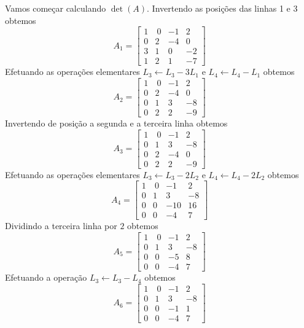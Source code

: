 \begin{solution}
Vamos começar calculando $\det(A)$. 
Invertendo as posições das linhas 1 e 3 obtemos
$$A_1 = \left[ \begin{array}{rrrr}
 1 & \ 0 & -1 &   2 \\  
 0 &   2 & -4 &   0 \\
 3 &   1 &  0 &  -2 \\
 1 &   2 &  1 &  -7
\end{array} \right]$$
Efetuando as operações elementares $L_3 \leftarrow L_3 - 3L_1$ e $L_4 \leftarrow L_4 - L_1$ obtemos
$$A_2 = \left[ \begin{array}{rrrr}
 1 & \ 0 & -1 &   2 \\  
 0 &   2 & -4 &   0 \\
 0 &   1 &  3 &  -8 \\
 0 &   2 &  2 &  -9
\end{array} \right]$$
Invertendo de posição a segunda e a terceira linha obtemos
$$A_3 = \left[ \begin{array}{rrrr}
 1 & \ 0 & -1 &   2 \\  
 0 &   1 &  3 &  -8 \\
 0 &   2 & -4 &   0 \\
 0 &   2 &  2 &  -9
\end{array} \right]$$
Efetuando as operações elementares $L_3 \leftarrow L_3 - 2L_2$ e $L_4 \leftarrow L_4 - 2L_2$ obtemos
$$A_4 = \left[ \begin{array}{rrrr}
 1 & \ 0 &  -1 &   2 \\  
 0 &   1 &   3 &  -8 \\
 0 &   0 & -10 &  16 \\
 0 &   0 &  -4 &   7
\end{array} \right]$$
Dividindo a terceira linha por $2$ obtemos
$$A_5 = \left[ \begin{array}{rrrr}
 1 & \ 0 &  -1 &   2 \\  
 0 &   1 &   3 &  -8 \\
 0 &   0 &  -5 &   8 \\
 0 &   0 &  -4 &   7
\end{array} \right]$$
Efetuando a operação $L_3 \leftarrow L_3 - L_4$ obtemos
$$A_6 = \left[ \begin{array}{rrrr}
 1 & \ 0 &  -1 &   2 \\  
 0 &   1 &   3 &  -8 \\
 0 &   0 &  -1 &   1 \\
 0 &   0 &  -4 &   7
\end{array} \right]$$

\end{solution}
